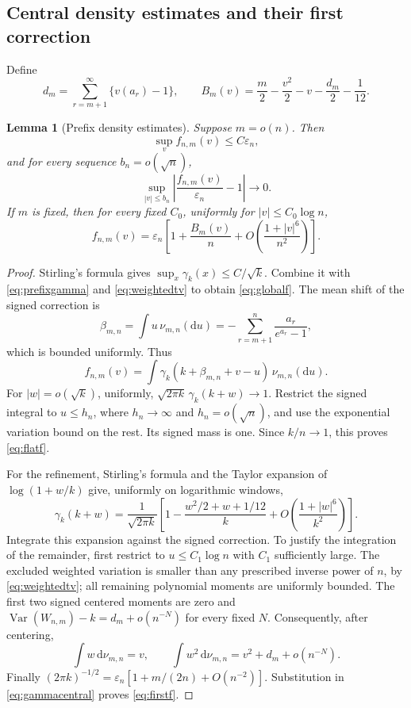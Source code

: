 \documentclass[11pt,a4paper]{article}
\numberwithin{equation}{section}
\newtheorem{lemma}[theorem]{Lemma}
\theoremstyle{definition}
\theoremstyle{remark}
\newcommand{\Var}{\operatorname{Var}}
\newcommand{\eps}{\varepsilon}
\newcommand{\dd}{\mathrm d}
\begin{document}
\subsection{Central density estimates and their first correction}
Define
\begin{equation}\label{eq:dm}
d_m=\sum_{r=m+1}^{\infty}\{v(a_r)-1\},\qquad
B_m(v)=\frac m2-\frac{v^2}{2}-v-\frac{d_m}{2}-\frac1{12}.
\end{equation}
\begin{lemma}[Prefix density estimates]\label{lem:local}
Suppose $m=o(n)$. Then
\begin{equation}\label{eq:globalf}
\sup_v f_{n,m}(v)\le C\eps_n,
\end{equation}
and for every sequence $b_n=o(\sqrt n)$,
\begin{equation}\label{eq:flatf}
\sup_{|v|\le b_n}\left|\frac{f_{n,m}(v)}{\eps_n}-1\right|\longrightarrow0.
\end{equation}
If $m$ is fixed, then for every fixed $C_0$, uniformly for
$|v|\le C_0\log n$,
\begin{equation}\label{eq:firstf}
f_{n,m}(v)=\eps_n\left[1+\frac{B_m(v)}n
                +O\!\left(\frac{1+|v|^6}{n^2}\right)\right].
\end{equation}
\end{lemma}
\begin{proof}
Stirling's formula gives $\sup_x\gamma_k(x)\le C/\sqrt k$. Combine it
with \eqref{eq:prefixgamma} and \eqref{eq:weightedtv} to obtain
\eqref{eq:globalf}. The mean shift of the signed correction is
\[
\beta_{m,n}=\int u\,\nu_{m,n}(\dd u)
 =-\sum_{r=m+1}^n\frac{a_r}{e^{a_r}-1},
\]
which is bounded uniformly. Thus
\[
f_{n,m}(v)=\int\gamma_k(k+\beta_{m,n}+v-u)\,\nu_{m,n}(\dd u).
\]
For $|w|=o(\sqrt k)$, uniformly,
$\sqrt{2\pi k}\,\gamma_k(k+w)\to1$. Restrict the signed integral to
$u\le h_n$, where $h_n\to\infty$ and $h_n=o(\sqrt n)$, and use the
exponential variation bound on the rest. Its signed mass is one. Since
$k/n\to1$, this proves \eqref{eq:flatf}.

For the refinement, Stirling's formula and the Taylor expansion of
$\log(1+w/k)$ give, uniformly on logarithmic windows,
\begin{equation}\label{eq:gammacentral}
\gamma_k(k+w)=\frac1{\sqrt{2\pi k}}
 \left[1-\frac{w^2/2+w+1/12}{k}
       +O\!\left(\frac{1+|w|^6}{k^2}\right)\right].
\end{equation}
Integrate this expansion against the signed correction. To justify the
integration of the remainder, first restrict to $u\le C_1\log n$ with
$C_1$ sufficiently large. The excluded weighted variation is smaller
than any prescribed inverse power of $n$, by \eqref{eq:weightedtv}; all
remaining polynomial moments are uniformly bounded. The first two
signed centered moments are zero and
$\Var(W_{n,m})-k=d_m+o(n^{-N})$ for every fixed $N$.
Consequently, after centering,
\[
\int w\,\dd\nu_{m,n}=v,\qquad
\int w^2\,\dd\nu_{m,n}=v^2+d_m+o(n^{-N}).
\]
Finally $(2\pi k)^{-1/2}=\eps_n[1+m/(2n)+O(n^{-2})]$.
Substitution in \eqref{eq:gammacentral} proves \eqref{eq:firstf}.
\end{proof}
\end{document}
